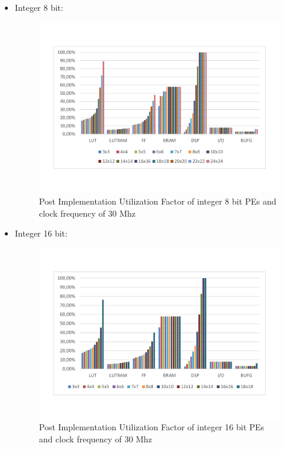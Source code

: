 \begin{itemize}
\item Integer 8 bit:
\begin{figure}[!htbp]
\centering
\captionsetup{justification=centering}
\includegraphics[scale=0.35,angle=0]{./figure/graphs/utilization_factor_30mhz_int8.pdf}
\caption{Post Implementation Utilization Factor of integer 8 bit PEs and clock frequency of 30 Mhz}
\label{fig:ut8bit}
\end{figure}
\item Integer 16 bit:
\begin{figure}[!htbp]
\centering
\captionsetup{justification=centering}
\includegraphics[scale=0.35,angle=0]{./figure/graphs/utilization_factor_30mhz_int16.pdf}
\caption{Post Implementation Utilization Factor of integer 16 bit PEs and clock frequency of 30 Mhz}

\end{figure}
\end{itemize}
